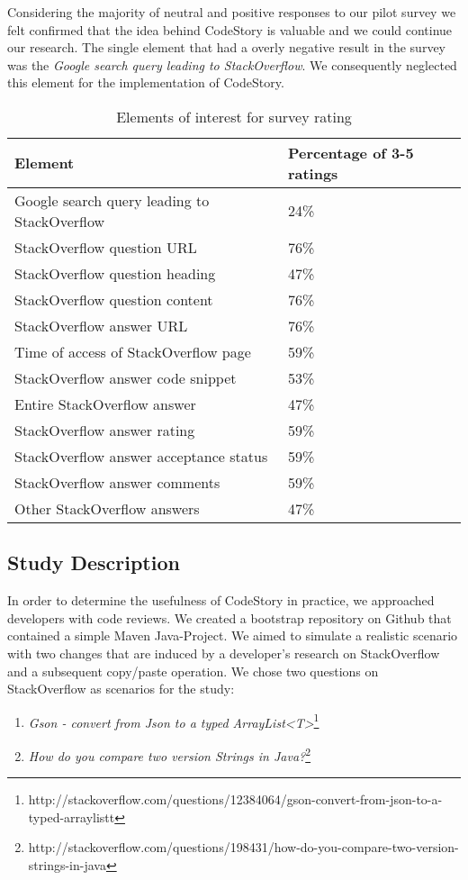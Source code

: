 \documentclass[../manifest.tex]{subfiles}
\begin{document}
Considering the majority of neutral and positive responses to our pilot survey we felt confirmed that the idea behind CodeStory is valuable and we could continue our research. The single element that had a overly negative result in the survey was the \textit{Google search query leading to StackOverflow}. We consequently neglected this element for the implementation of CodeStory.

\begin{table*}[t]
    \label{tab:elements-of-interest}
    \centering
    \begin{threeparttable}
    \begin{tabular*}{\textwidth}{ll}
    \hline
    \textbf{Element} & \textbf{Percentage of 3-5 ratings} \\
    \hline
    Google search query leading to StackOverflow & 24\% \\
    StackOverflow question URL & 76\% \\
    StackOverflow question heading & 47\% \\
    StackOverflow question content & 76\% \\
    StackOverflow answer URL & 76\% \\
    Time of access of StackOverflow page & 59\% \\
    StackOverflow answer code snippet & 53\% \\
    Entire StackOverflow answer & 47\% \\
    StackOverflow answer rating & 59\% \\
    StackOverflow answer acceptance status & 59\% \\
    StackOverflow answer comments & 59\% \\
    Other StackOverflow answers & 47\% \\
    \hline
    \end{tabular*}
    \end{threeparttable}
    \caption{Elements of interest for survey rating}
\end{table*}

\subsection{Study Description} \label{eval-description}

In order to determine the usefulness of CodeStory in practice, we approached developers with code reviews. We created a bootstrap repository on Github that contained a simple Maven Java-Project. We aimed to simulate a realistic scenario with two changes that are induced by a developer's research on StackOverflow and a subsequent copy/paste operation. We chose two questions on StackOverflow as scenarios for the study:
\begin{enumerate}
  \item \textit{Gson - convert from Json to a typed ArrayList<T>}\footnote{http://stackoverflow.com/questions/12384064/gson-convert-from-json-to-a-typed-arraylistt}
  \item \textit{How do you compare two version Strings in Java?}\footnote{http://stackoverflow.com/questions/198431/how-do-you-compare-two-version-strings-in-java}
\end{enumerate}
\end{document}
